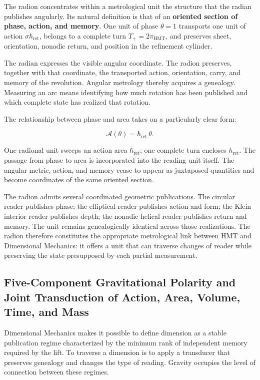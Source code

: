 The radion concentrates within a metrological unit the structure that the radian publishes angularly. Its natural definition is that of an \textbf{oriented section of phase, action, and memory}. One unit of phase \(\theta=1\) transports one unit of action \(\sigma\hbar_{\mathrm{ret}}\), belongs to a complete turn \(T_+=2\pi_{\mathrm{HMT}}\), and preserves sheet, orientation, nonadic return, and position in the refinement cylinder.

The radian expresses the visible angular coordinate. The radion preserves, together with that coordinate, the transported action, orientation, carry, and memory of the revolution. Angular metrology thereby acquires a genealogy. Measuring an arc means identifying how much rotation has been published and which complete state has realized that rotation.

The relationship between phase and area takes on a particularly clear form:

\[
\mathcal A(\theta)=\hbar_{\mathrm{ret}}\,\theta.
\]

One radional unit sweeps an action area \(\hbar_{\mathrm{ret}}\); one complete turn encloses \(h_{\mathrm{ret}}\). The passage from phase to area is incorporated into the reading unit itself. The angular metric, action, and memory cease to appear as juxtaposed quantities and become coordinates of the same oriented section.

The radion admits several coordinated geometric publications. The circular reader publishes phase; the elliptical reader publishes action and form; the Klein interior reader publishes depth; the nonadic helical reader publishes return and memory. The unit remains genealogically identical across those realizations. The radion therefore constitutes the appropriate metrological link between HMT and Dimensional Mechanics: it offers a unit that can traverse changes of reader while preserving the state presupposed by each partial measurement.

\subsection{Five-Component Gravitational Polarity and Joint Transduction of Action, Area, Volume, Time, and Mass}

Dimensional Mechanics makes it possible to define dimension as a stable publication regime characterized by the minimum rank of independent memory required by the lift. To traverse a dimension is to apply a transducer that preserves genealogy and changes the type of reading. Gravity occupies the level of connection between these regimes.

